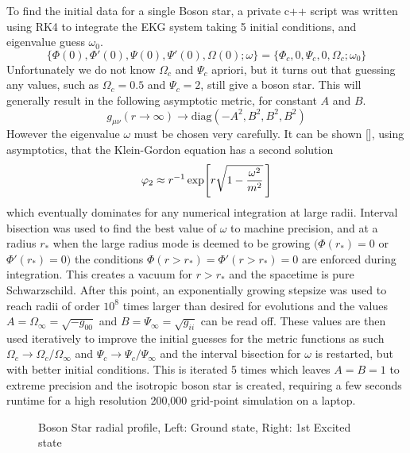 To find the initial data for a single Boson star, a private c++ script was written using RK4 to integrate the EKG system taking 5 initial conditions, and eigenvalue guess $\omega_0$. 
\[ \{\Phi(0),\Phi'(0),\Psi(0),\Psi'(0),\Omega(0);\omega \} = \{ \Phi_c,0,\Psi_c,0,\Omega_c;\omega_0\}\]
Unfortunately we do not know $\Omega_c$ and $\Psi_c$ apriori, but it turns out that guessing any values, such as $\Omega_c=0.5$ and $\Psi_c=2$, still give a boson star. This will generally result in the following asymptotic metric, for constant $A$ and $B$.
\begin{equation} g_{\mu\nu}(r\rightarrow\infty) \rightarrow \mathrm{diag}(-A^2,B^2,B^2,B^2)\end{equation}
However the eigenvalue $\omega$ must be chosen very carefully. It can be shown [], using asymptotics, that the Klein-Gordon equation has a second solution 
\[\varphi_2 \approx r^{-1}\exp[r\sqrt{1-\frac{\omega^2}{m^2}}\,]\]
 which eventually dominates for any numerical integration at large radii. Interval bisection was used to find the best value of $\omega$ to machine precision, and at a radius $r_*$ when the large radius mode is deemed to be growing $(\Phi(r_*)=0$ or $\Phi'(r_*)=0)$ the conditions $\Phi(r>r_*)=\Phi'(r>r_*)=0$ are enforced during integration. This creates a vacuum for $r>r_*$ and the spacetime is pure Schwarzschild. After this point, an exponentially growing stepsize was used to reach radii of order $10^8$ times larger than desired for evolutions and the values $A = \Omega_\infty= \sqrt{-g_{00}}$ and $B=\Psi_{\infty}=\sqrt{g_{ii}}$ can be read off. These values are then used iteratively to improve the initial guesses for the metric functions as such $\Omega_c \rightarrow \Omega_c / \Omega_\infty$ and $\Psi_c \rightarrow \Psi_c / \Psi_\infty$ and the interval bisection for $\omega$ is restarted, but with better initial conditions. This is iterated 5 times which leaves $A=B=1$ to extreme precision and the isotropic boson star is created, requiring a few seconds runtime for a high resolution 200,000 grid-point simulation on a laptop.



  \begin{figure}[H]
  \caption{Boson Star radial profile, Left: Ground state, Right: 1st Excited state}
  \centering
  \hfill
\end{figure}

